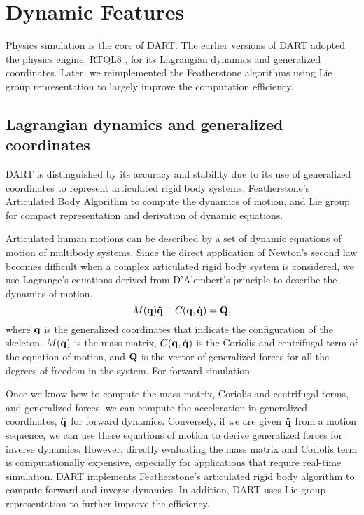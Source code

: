 \section{Dynamic Features}
Physics simulation is the core of DART. The earlier versions of DART
adopted the physics engine, RTQL8 \cite{}, for its Lagrangian dynamics
and generalized coordinates. Later, we reimplemented the Featherstone
algorithms using Lie group representation to largely improve the
computation efficiency.

\subsection{Lagrangian dynamics and generalized coordinates}
DART is distinguished by its accuracy and stability due to its use of
generalized coordinates to represent articulated rigid body systems,
Featherstone’s Articulated Body Algorithm to compute the dynamics of
motion, and Lie group for compact representation and derivation of
dynamic equations.

Articulated human motions can be described by a set of dynamic
equations of motion of multibody systems. Since the direct application
of Newton’s second law becomes difficult when a complex articulated
rigid body system is considered, we use Lagrange’s equations derived
from D’Alembert’s principle to describe the dynamics of motion. 
\begin{equation}
M(\mathbf{q})\ddot{\mathbf{q}} + C(\mathbf{q}, \dot{\mathbf{q}}) = \mathbf{Q},
\end{equation}
where $\mathbf{q}$ is the generalized coordinates that indicate the 
configuration of the skeleton. $M(\mathbf{q})$ is the mass matrix,
$C(\mathbf{q},\dot{\mathbf{q}})$ is the Coriolis and centrifugal term of the
equation of motion, and $\mathbf{Q}$ is the vector of generalized forces
for all the degrees of freedom in the system. For forward simulation

Once we know how to compute the mass matrix, Coriolis and centrifugal
terms, and generalized forces, we can compute the acceleration in
generalized coordinates, $\ddot{\mathbf{q}}$ for forward dynamics. Conversely, if we
are given $\ddot{\mathbf{q}}$ from a motion sequence, we can use these equations of
motion to derive generalized forces for inverse dynamics. However,
directly evaluating the mass matrix and Coriolis term is 
computationally expensive, especially for applications that require
real-time simulation. DART implements Featherstone's articulated rigid
body algorithm to compute forward and inverse dynamics. In addition,
DART uses Lie group representation to further improve the efficiency.

